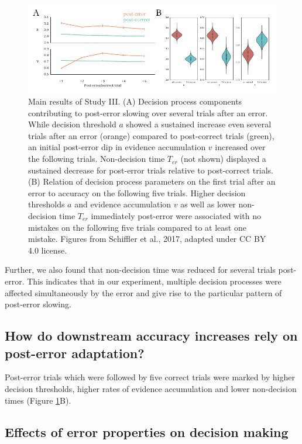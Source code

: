 \documentclass[12pt,openany]{book}
\theoremstyle{definition}
\theoremstyle{definition}
\theoremstyle{definition}
\theoremstyle{remark}
\begin{document}
\begin{figure}
  \centering
  \includegraphics{./figures/results_study3.pdf}
  \caption{Main results of Study III. (A) Decision process components contributing to post-error slowing over several trials after an error. While decision threshold $a$ showed a sustained increase even several trials after an error (orange) compared to post-correct trials (green), an initial post-error dip in evidence accumulation $v$ increased over the following trials. Non-decision time $T_{er}$ (not shown) displayed a sustained decrease for post-error trials relative to post-correct trials. (B) Relation of decision process parameters on the first trial after an error to accuracy on the following five trials. Higher decision thresholds $a$ and evidence accumulation $v$ as well as lower non-decision time $T_{er}$ immediately post-error were associated with no mistakes on the following five trials compared to at least one mistake. Figures from Schiffler et al., 2017, adapted under CC BY 4.0 license.\label{fig_results_study3}}
\end{figure}

Further, we also found that non-decision time was reduced for several
trials post-error. This indicates that in our experiment, multiple
decision processes were affected simultaneously by the error and give
rise to the particular pattern of post-error slowing.

\subsection{How do downstream accuracy increases rely on post-error
adaptation?}\label{how-do-downstream-accuracy-increases-rely-on-post-error-adaptation}

Post-error trials which were followed by five correct trials were marked
by higher decision thresholds, higher rates of evidence accumulation and
lower non-decision times (Figure \ref{fig_results_study3}B).

\subsection{Effects of error properties on decision
making}\label{effects-of-error-properties-on-decision-making}
\end{document}
